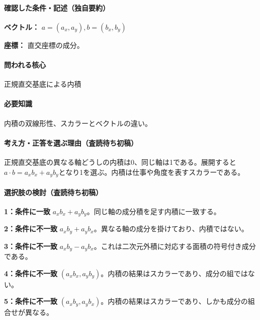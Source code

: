 \paragraph{確認した条件・記述（独自要約）}\mbox{}\par

\noindent\textbf{ベクトル：} \(a=(a_x,a_y),b=(b_x,b_y)\)\par

\noindent\textbf{座標：} 直交座標の成分。\par

\paragraph{問われる核心} 正規直交基底による内積

\paragraph{必要知識} 内積の双線形性、スカラーとベクトルの違い。

\paragraph{考え方・正答を選ぶ理由（査読待ち初稿）} 正規直交基底の異なる軸どうしの内積は0、同じ軸は1である。展開すると\(a\cdot b=a_xb_x+a_yb_y\)となり1を選ぶ。内積は仕事や角度を表すスカラーである。

\paragraph{選択肢の検討（査読待ち初稿）}\mbox{}\par

\noindent\textbf{1：条件に一致} \(a_xb_x+a_yb_y\)。同じ軸の成分積を足す内積に一致する。\par

\noindent\textbf{2：条件に不一致} \(a_xb_y+a_yb_x\)。異なる軸の成分を掛けており、内積ではない。\par

\noindent\textbf{3：条件に不一致} \(a_xb_y-a_yb_x\)。これは二次元外積に対応する面積の符号付き成分である。\par

\noindent\textbf{4：条件に不一致} \((a_xb_x,a_yb_y)\)。内積の結果はスカラーであり、成分の組ではない。\par

\noindent\textbf{5：条件に不一致} \((a_xb_y,a_yb_x)\)。内積の結果はスカラーであり、しかも成分の組合せが異なる。\par

